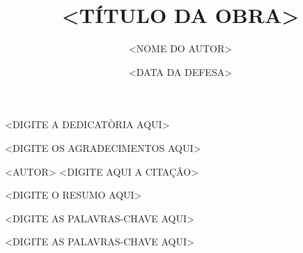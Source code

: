 \documentclass{ufbathesis}
\institute{<NOME DO INSTITUTO OU CENTRO ACADÊMICO>}
\title{<TÍTULO DA OBRA>}
\date{<DATA DA DEFESA>}
\author{<NOME DO AUTOR>}
\begin{document}
\frontmatter

\frontpage

\presentationpage

\begin{dedicatory}
<DIGITE A DEDICATÒRIA AQUI>
\end{dedicatory}

\acknowledgements
<DIGITE OS AGRADECIMENTOS AQUI>

\begin{epigraph}[<NOTA>]{<AUTOR>}
<DIGITE AQUI A CITAÇÂO>
\end{epigraph}

\resumo
<DIGITE O RESUMO AQUI>
\begin{keywords}
<DIGITE AS PALAVRAS-CHAVE AQUI>
\end{keywords}

\abstract
\begin{keywords}
<DIGITE AS PALAVRAS-CHAVE AQUI>
\end{keywords}

\tableofcontents

\listoffigures

\listoftables



\mainmatter

% 
% 
% 
\end{document}
